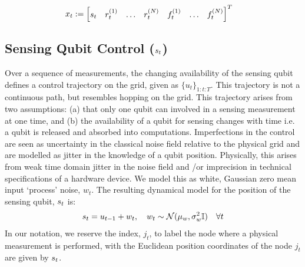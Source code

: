 \begin{align}
x_t & := \begin{bmatrix}
s_{ t} & 
r^{( 1 )}_{t} &
\hdots &
r^{( N )}_{t} &
f^{( 1 )}_{t} &
\hdots &
f^{( N )}_{t} 
\end{bmatrix}^T
\end{align}


\subsection{Sensing Qubit Control ($s_{ t}$)}
Over a sequence of measurements, the changing availability of the sensing qubit defines a control trajectory on the grid, given as $\{u_{t}\}_{1:t:T}$. This trajectory is not a continuous path, but resembles hopping on the grid. This trajectory arises from two assumptions: (a) that only one qubit can involved in a sensing measurement at one time, and (b) the availability of a qubit for sensing changes with time i.e. a qubit is released and absorbed into computations. Imperfections in the control are seen as uncertainty in the classical noise field relative to the physical grid and are modelled as jitter in the knowledge of a qubit position. Physically, this arises from weak time domain jitter in the noise field and /or imprecision in technical specifications of a hardware device. We model this as white, Gaussian zero mean input `process' noise, $w_t$. The resulting dynamical model for the position of the sensing qubit, $s_{ t}$ is:
\begin{align}
s_{ t} = u_{t-1} + w_t, \quad w_t \sim \mathcal{N}(\mu_w, \sigma_w^2 \mathbb{I}) \quad \forall t
\end{align} In our notation, we reserve the index, $j_t$, to label the node where a physical measurement is performed, with the Euclidean position coordinates of the node $j_t$ are given by $s_{ t}$.

